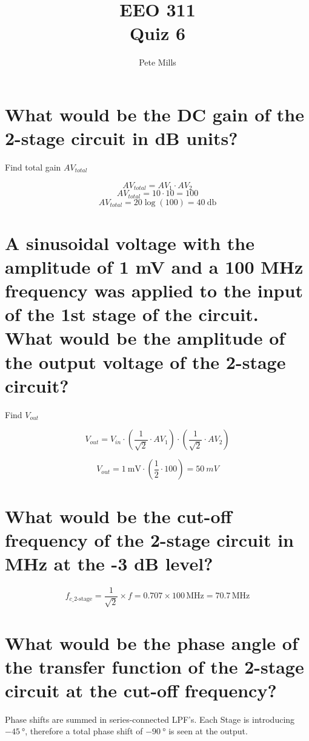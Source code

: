 \documentclass[11pt]{article} %
\title{EEO 311 \\ Quiz 6}
\author{Pete Mills}
\begin{document}
\maketitle

\section{What would be the DC gain  of the  2-stage circuit in dB units?}

Find total gain $AV_{total}$

$$AV_{total} = AV_1 \cdot AV_2$$
$$AV_{total} = 10 \cdot 10 = 100$$
$$AV_{total} = 20\log(100) = \SI{40}\decibel$$

\section{A sinusoidal voltage with the amplitude of 1 mV and a 100 MHz frequency was applied to the input of the 1st stage of the circuit. What would be the amplitude of the output voltage of the 2-stage circuit?}

Find $V_{out}$

$$V_{out} = V_{in} \cdot (\frac{1}{\sqrt{2}} \cdot AV_1) \cdot (\frac{1}{\sqrt{2}} \cdot AV_2)$$

$$V_{out} = \SI{1}{\mV} \cdot (\frac{1}{2} \cdot 100) = \SI{50}{mV}$$

\section{What would be the cut-off frequency of the 2-stage circuit in MHz at the -3 dB level?}


\[
f_{c\_2\text{-stage}} = \frac{1}{\sqrt{2}} \times f = 0.707 \times 100 \, \text{MHz} = 70.7 \, \text{MHz}
\]

\section{What would be the phase angle of the transfer function of the 2-stage circuit at the cut-off frequency? }

Phase shifts are summed in series-connected LPF's. Each Stage is introducing $\SI{-45}\degree$, therefore a total phase shift of $\SI{-90}\degree$ is seen at the output.
\end{document}

